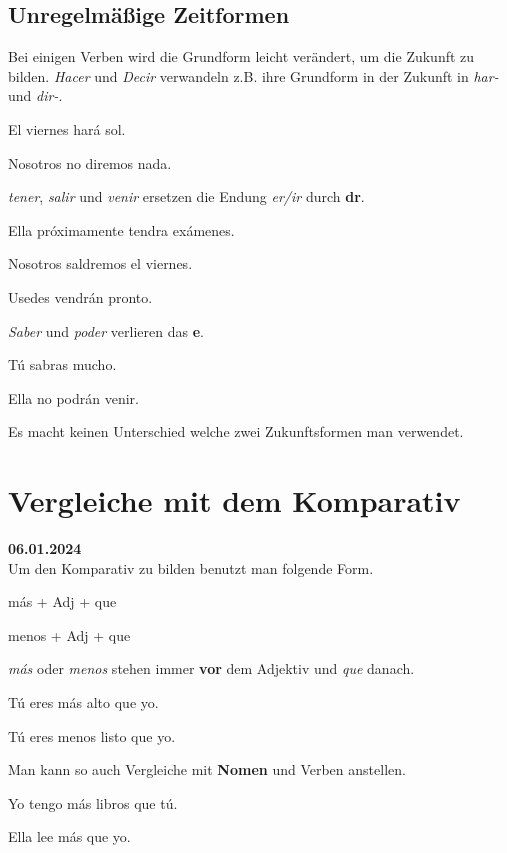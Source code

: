 \subsection*{Unregelmäßige Zeitformen}
Bei einigen Verben wird die Grundform leicht verändert,
um die Zukunft zu bilden. \textit{Hacer} und \textit{Decir}
verwandeln z.B. ihre Grundform in der Zukunft in \textit{har-}
und \textit{dir-}.
\begin{ejemplos}
    \item El viernes har\'a sol.
    \item Nosotros no diremos nada.
\end{ejemplos}
\textit{tener}, \textit{salir} und \textit{venir} ersetzen
die Endung \textit{er/ir} durch \textbf{dr}.
\begin{ejemplos}
    \item Ella pr\'oximamente tendra ex\'amenes.
    \item Nosotros saldremos el viernes.
    \item Usedes vendr\'an pronto.
\end{ejemplos}
\textit{Saber} und \textit{poder} verlieren das \textbf{e}.
\begin{ejemplos}
    \item T\'u  sabras mucho.
    \item Ella no podr\'an venir.
\end{ejemplos}
Es macht keinen Unterschied welche zwei Zukunftsformen man 
verwendet.
\section{Vergleiche mit dem Komparativ}
\textbf{06.01.2024}\\
Um den Komparativ zu bilden benutzt man folgende Form.
\begin{gramatica}
    \item m\'as + Adj + que
    \item menos + Adj + que
\end{gramatica}
\textit{m\'as} oder \textit{menos} stehen immer \textbf{vor}
dem Adjektiv und \textit{que} danach.
\begin{ejemplos}
    \item T\'u eres m\'as alto que yo.
    \item T\'u eres menos listo que yo.
\end{ejemplos}
Man kann so auch Vergleiche mit \textbf{Nomen} und Verben
anstellen.
\begin{ejemplos}
    \item Yo tengo m\'as libros que t\'u.
    \item Ella lee m\'as que yo.
\end{ejemplos}
